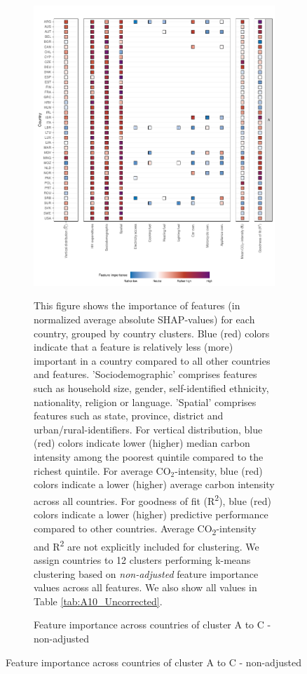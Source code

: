 \clearpage
\begin{figure}[ht!]
    \centering
    \caption{Feature importance across countries by cluster - Alternative clustering}\label{fig:fig_4_uncorrected}
    \begin{subfigure}[b]{\textwidth}
    \centering
    \includegraphics{1_Figures/Figure 4/Figure_4_Uncorrected_1.pdf}
    \caption{Feature importance across countries of cluster A to C - non-adjusted}\label{fig:fig_4_1_uncorrected}
     \begin{subcaption2}
    This figure shows the importance of features (in normalized average absolute SHAP-values) for each country, grouped by country clusters. Blue (red) colors indicate that a feature is relatively less (more) important in a country compared to all other countries and features. 'Sociodemographic' comprises features such as household size, gender, self-identified ethnicity, nationality, religion or language. 'Spatial' comprises features such as state, province, district and urban/rural-identifiers. For vertical distribution, blue (red) colors indicate lower (higher) median carbon intensity among the poorest quintile compared to the richest quintile. For average CO$_{2}$-intensity, blue (red) colors indicate a lower (higher) average carbon intensity across all countries. For goodness of fit (R\textsuperscript{2}), blue (red) colors indicate a lower (higher) predictive performance compared to other countries. Average CO\textsubscript{2}-intensity and R\textsuperscript{2} are not explicitly included for clustering.
    We assign countries to 12 clusters performing k-means clustering based on \textit{non-adjusted} feature importance values across all features. We also show all values in Table \ref{tab:A10_Uncorrected}.
    \end{subcaption2}
    \end{subfigure}
\end{figure}
\clearpage

